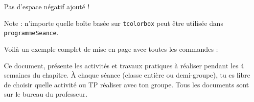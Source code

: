 \begin{boiteCodeTex}{}
  \vspace*{-36 pt}

  Pas d'espace négatif ajouté !
\end{boiteCodeTex}

Note : n'importe quelle boîte basée sur \lstinline|tcolorbox| peut être utilisée dans \lstinline|programmeSeance|.

\newpage
{}

Voilà un exemple complet de mise en page avec toutes les commandes :

\begin{boiteCodeTex}{}
  \newpage

  \begin{importants}
    Ce document,  présente les activités et travaux pratiques à réaliser pendant les 4 semaines du chapitre.
    À chaque séance (classe entière ou demi-groupe), tu es libre de choisir quelle activité ou TP réaliser avec ton groupe.
    Tous les documents sont sur le bureau du professeur.
  \end{importants}


\end{boiteCodeTex}
